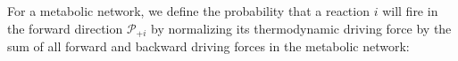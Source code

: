 For a metabolic network, we define the probability that a reaction $i$ will fire in the forward  direction ${\mathcal P_{+i}}$ by normalizing its thermodynamic driving force by the sum of all forward and backward driving forces in the metabolic network: